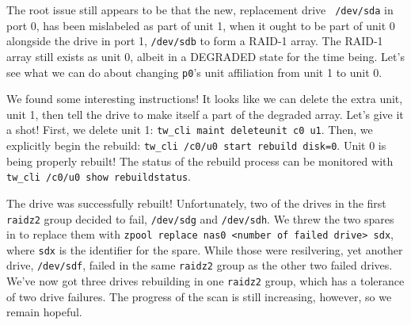 \documentclass[12pt]{article}
\begin{document}
\qq The root issue still appears to be that the new, replacement drive {\tt
  /dev/sda} in port 0, has been mislabeled as part of unit 1, when it ought to
be part of unit 0 alongside the drive in port 1, {\tt /dev/sdb} to form a RAID-1
array. The RAID-1 array still exists as unit 0, albeit in a DEGRADED state for
the time being. Let's see what we can do about changing {\tt p0}'s unit
affiliation from unit 1 to unit 0. 

\qq We found some interesting instructions! It looks like we can delete the
extra unit, unit 1, then tell the drive to make itself a part of the degraded
array. Let's give it a shot! First, we delete unit 1: {\tt tw\_cli maint
  deleteunit c0 u1}. Then, we explicitly begin the rebuild: {\tt tw\_cli /c0/u0
  start rebuild disk=0}. Unit 0 is being properly rebuilt! The status of the
rebuild process can be monitored with {\tt tw\_cli /c0/u0 show rebuildstatus}. 

\qq The drive was successfully rebuilt! Unfortunately, two of the drives in the
first {\tt raidz2} group decided to fail, {\tt /dev/sdg} and {\tt /dev/sdh}. We
threw the two spares in to replace them with {\tt zpool replace nas0 <number of
  failed drive> sdx}, where {\tt sdx} is the identifier for the spare. While
those were resilvering, yet another drive, {\tt /dev/sdf}, failed in the same
{\tt raidz2} group as the other two failed drives. We've now got three drives
rebuilding in one {\tt raidz2} group, which has a tolerance of two drive
failures. The progress of the scan is still increasing, however, so we remain
hopeful. 
\end{document}

